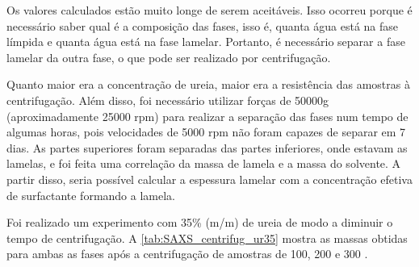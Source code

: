 	Os valores calculados estão muito longe de serem aceitáveis. Isso ocorreu porque é necessário saber qual é a composição das fases, isso é, quanta água está na fase límpida e quanta água está na fase lamelar. Portanto, é necessário separar a fase lamelar da outra fase, o que pode ser realizado por centrifugação.

	Quanto maior era a concentração de ureia, maior era a resistência das amostras à centrifugação. Além disso, foi necessário utilizar forças de 50000g (aproximadamente 25000 rpm) para realizar a separação das fases num tempo de algumas horas, pois velocidades de 5000 rpm não foram capazes de separar em 7 dias. As partes superiores foram separadas das partes inferiores, onde estavam as lamelas, e foi feita uma correlação da massa de lamela e a massa do solvente. A partir disso, seria possível calcular a espessura lamelar com a concentração efetiva de surfactante formando a lamela.
	
	Foi realizado um experimento com 35\% (m/m) de ureia de modo a diminuir o tempo de centrifugação. A \autoref{tab:SAXS_centrifug_ur35} mostra as massas obtidas para ambas as fases após a centrifugação de amostras de \CTDTAB{} 100, 200 e 300 \mM{}.
	
